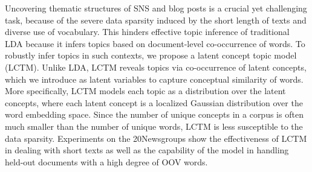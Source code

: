 Uncovering thematic structures of SNS and blog posts is a crucial yet challenging task, because of the severe data sparsity induced by the short length of texts and diverse use of vocabulary. This hinders effective topic inference of traditional LDA because it infers topics based on document-level co-occurrence of words. To robustly infer topics in such contexts, we propose a latent concept topic model (LCTM). Unlike LDA, LCTM reveals topics via co-occurrence of latent concepts, which we introduce as latent variables to capture conceptual similarity of words. More specifically, LCTM models each topic as a distribution over the latent concepts, where each latent concept is a localized Gaussian distribution over the word embedding space. Since the number of unique concepts in a corpus is often much smaller than the number of unique words, LCTM is less susceptible to the data sparsity. Experiments on the 20Newsgroups show the effectiveness of LCTM in dealing with short texts as well as the capability of the model in handling held-out documents with a high degree of OOV words.
